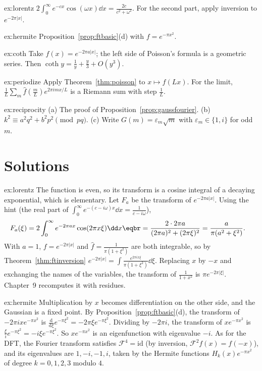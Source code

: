 \begin{hint}{ex:lorentz}
$2\int_0^\infty e^{-cx}\cos(\omega x)\dd x=\frac{2c}{c^2+\omega^2}$. For the second part, apply inversion to $e^{-2\pi|x|}$.
\end{hint}
\begin{hint}{ex:hermite}
Proposition~\ref{prop:ftbasic}(d) with $f=e^{-\pi x^2}$.
\end{hint}
\begin{hint}{ex:coth}
Take $f(x)=e^{-2\pi a|x|}$; the left side of Poisson's formula is a geometric series. Then $\coth y=\frac1y+\frac y3+O(y^3)$.
\end{hint}
\begin{hint}{ex:periodize}
Apply Theorem~\ref{thm:poisson} to $x\mapsto f(Lx)$. For the limit, $\frac1L\sum_m\hat f(\frac mL)e^{2\pi imx/L}$ is a Riemann sum with step $\frac1L$.
\end{hint}
\begin{hint}{ex:reciprocity}
(a) The proof of Proposition~\ref{prop:gaussfourier}. (b) $k^2\equiv a^2q^2+b^2p^2\pmod{pq}$. (c) Write $G(m)=\varepsilon_m\sqrt m$ with $\varepsilon_m\in\{1,i\}$ for odd $m$.
\end{hint}

\section{Solutions}

\begin{solution}{ex:lorentz}
\idea The function is even, so its transform is a cosine integral of a decaying exponential, which is elementary.
\writeup Let $F_a$ be the transform of $e^{-2\pi a|x|}$. Using the hint (the real part of $\int_0^\infty e^{-(c-i\omega)x}\dd x=\frac1{c-i\omega}$),
\[
\begin{aligned}F_a(\xi)&=2\int_0^\infty e^{-2\pi ax}\cos(2\pi x\xi)\dd x\eqbr=\frac{2\cdot2\pi a}{(2\pi a)^2+(2\pi\xi)^2}=\frac a{\pi(a^2+\xi^2)}.\end{aligned}
\]
With $a=1$, $f=e^{-2\pi|x|}$ and $\hat f=\frac1{\pi(1+\xi^2)}$ are both integrable, so by Theorem~\ref{thm:ftinversion}
$e^{-2\pi|x|}=\int\frac{e^{2\pi ix\xi}}{\pi(1+\xi^2)}\dd\xi$. Replacing $x$ by $-x$ and exchanging the names of the variables, the transform of $\frac1{1+x^2}$ is $\pi e^{-2\pi|\xi|}$.
Chapter~9 recomputes it with residues.
\end{solution}

\begin{solution}{ex:hermite}
\idea Multiplication by $x$ becomes differentiation on the other side, and the Gaussian is a fixed point.
\writeup By Proposition~\ref{prop:ftbasic}(d), the transform of $-2\pi ixe^{-\pi x^2}$ is $\frac{\mathrm d}{\mathrm d\xi}e^{-\pi\xi^2}=-2\pi\xi e^{-\pi\xi^2}$. Dividing by $-2\pi i$, the transform of
$xe^{-\pi x^2}$ is $\frac{\xi}ie^{-\pi\xi^2}=-i\xi e^{-\pi\xi^2}$. So $xe^{-\pi x^2}$ is an eigenfunction with eigenvalue $-i$. As for the DFT, the Fourier transform satisfies
$\mathcal F^4=\mathrm{id}$ (by inversion, $\mathcal F^2f(x)=f(-x)$), and its eigenvalues are $1,-i,-1,i$, taken by the Hermite functions $H_k(x)e^{-\pi x^2}$ of
degree $k=0,1,2,3$ modulo $4$.
\end{solution}

